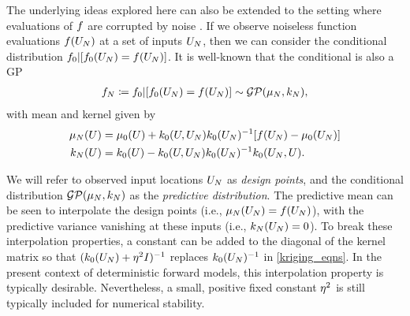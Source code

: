 \documentclass[12pt]{article}
\begin{document}
The underlying ideas explored here can also be extended to the setting where evaluations of $\func$ 
are corrupted by noise \citep{stochasticComputerModels,VehtariParallelGP,OakleyllikEm}. 
If we observe noiseless function evaluations $\func(\designIn)$ at a set of inputs $\designIn$, then we can consider
the conditional distribution $\funcPrior|[\funcPrior(\designIn)=\func(\designIn)]$. It is well-known
\citep{gpML} that the conditional is also a GP
\begin{align}
\funcEm[\Ndesign] \Def \funcPrior|[\funcPrior(\designIn)=\func(\designIn)]\sim \GP(\gpMean[\Ndesign], \gpKer[\Ndesign]), \label{generic_gp_conditional}
\end{align}
with mean and kernel given by
\begin{align}
\gpMean[\Ndesign](\parMat) &= \gpMeanPrior(\parMat) + \gpKerPrior(\parMat, \designIn) \gpKerPrior(\designIn)^{-1} [\func(\designIn) - \gpMeanPrior(\designIn)] \label{kriging_eqns} \\
\gpKer[\Ndesign](\parMat) &= \gpKerPrior(\parMat) - \gpKerPrior(\parMat, \designIn) \gpKerPrior(\designIn)^{-1} \gpKerPrior(\designIn, \parMat). \nonumber
\end{align}

We will refer to observed input locations $\designIn$ as \textit{design points}, and the conditional
distribution $\GP(\gpMean[\Ndesign], \gpKer[\Ndesign])$ as the \textit{predictive distribution}.
The predictive mean can be seen to interpolate the design points (i.e., $\gpMean[\Ndesign](\designIn) = \func(\designIn[\Ndesign])$), with 
the predictive variance vanishing at these inputs (i.e., $\gpKer[\Ndesign](\designIn) = 0$). 
To break these interpolation properties,
a constant can be added to the diagonal of the kernel matrix so that $(\gpKerPrior(\designIn) + \nuggetSD^2 I)^{-1}$ replaces 
$\gpKerPrior(\designIn)^{-1}$ in \cref{kriging_eqns}. In the present context of deterministic forward models, 
this interpolation property is typically desirable. Nevertheless, a small, positive fixed constant $\nuggetSD^2$ is still 
typically included for numerical stability. 
\end{document}
